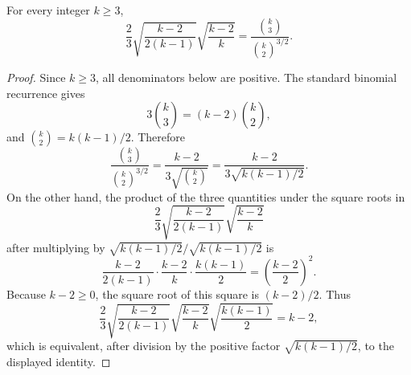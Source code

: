 \begin{helper}
For every integer $k\ge 3$,
\[
\frac{2}{3}
\sqrt{\frac{k-2}{2(k-1)}}
\sqrt{\frac{k-2}{k}}
=
\frac{\binom{k}{3}}{\binom{k}{2}^{3/2}}.
\]
\end{helper}
\begin{proof}
Since $k\ge 3$, all denominators below are positive.  The standard binomial
recurrence gives
\[
3\binom{k}{3}=(k-2)\binom{k}{2},
\]
and $\binom{k}{2}=k(k-1)/2$.  Therefore
\[
\frac{\binom{k}{3}}{\binom{k}{2}^{3/2}}
=
\frac{k-2}{3\sqrt{\binom{k}{2}}}
=
\frac{k-2}{3\sqrt{k(k-1)/2}}.
\]
On the other hand, the product of the three quantities under the square roots
in
\[
\frac{2}{3}
\sqrt{\frac{k-2}{2(k-1)}}
\sqrt{\frac{k-2}{k}}
\]
after multiplying by $\sqrt{k(k-1)/2}/\sqrt{k(k-1)/2}$ is
\[
\frac{k-2}{2(k-1)}\cdot\frac{k-2}{k}\cdot\frac{k(k-1)}2
=\left(\frac{k-2}{2}\right)^2.
\]
Because $k-2\ge 0$, the square root of this square is $(k-2)/2$.  Thus
\[
\frac{2}{3}
\sqrt{\frac{k-2}{2(k-1)}}
\sqrt{\frac{k-2}{k}}
\sqrt{\frac{k(k-1)}2}=k-2,
\]
which is equivalent, after division by the positive factor
$\sqrt{k(k-1)/2}$, to the displayed identity.
\end{proof}
